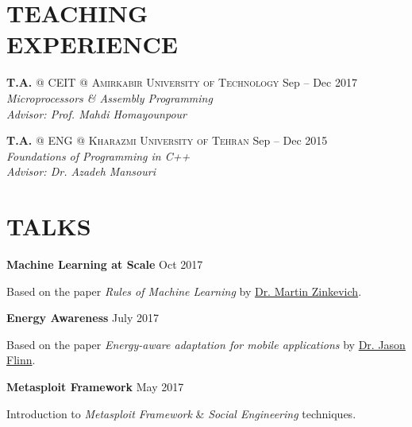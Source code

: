 \documentclass[margin, 10pt]{res} %
\begin{document}
\begin{resume}
    \section{TEACHING \\ EXPERIENCE} 
    
   \textbf{T.A.} \textsc{@}
   \textsc{CEIT} \textsc{@} \textsc{Amirkabir University of Technology}
   \hfill {Sep -- Dec 2017}\\
   \textit{Microprocessors \& Assembly Programming}\\
   \textit{Advisor: Prof. Mahdi Homayounpour}
   
   \textbf{T.A.} \textsc{@}
   \textsc{ENG} \textsc{@} \textsc{Kharazmi University of Tehran}
   \hfill {Sep -- Dec 2015}\\
   \textit{Foundations of Programming in C++}\\
   \textit{Advisor: Dr. Azadeh Mansouri}


	\section{TALKS} 
	\textbf{Machine Learning at Scale}
	\hfill {Oct 2017}
		\vspace{0.15cm}
	\begin{innerlist}
		\item Based on the paper \textit{Rules of Machine Learning} by \href{http://martin.zinkevich.org/rules_of_ml/rules_of_ml.pdf}{Dr. Martin Zinkevich}.
	\end{innerlist}

	\textbf{Energy Awareness}
	\hfill {July 2017}
		\vspace{0.15cm}
	\begin{innerlist}
		\item Based on the paper \textit{Energy-aware adaptation for mobile applications} by \href{http://www-cgi.cs.cmu.edu/afs/cs.cmu.edu/Web/People/odyssey/docdir/s17.pdf5}{Dr. Jason Flinn}.
	\end{innerlist}

	\textbf{Metasploit Framework}
	\hfill {May 2017}
		\vspace{0.15cm}
	\begin{innerlist}
		\item Introduction to \textit{Metasploit Framework} \& \textit{Social Engineering} techniques.
	\end{innerlist}



\end{resume}
\end{document}

